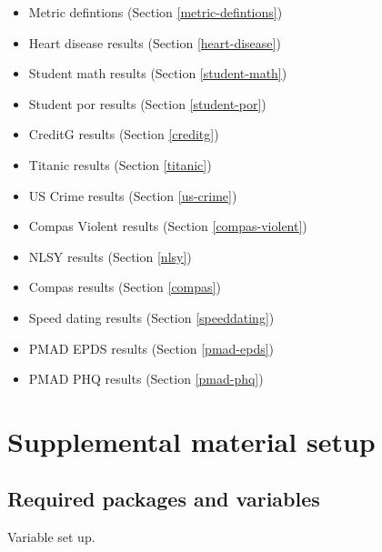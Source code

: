 \documentclass[
]{book}
\providecommand{\tightlist}{%
  \setlength{\itemsep}{0pt}\setlength{\parskip}{0pt}}
\begin{document}
\begin{itemize}
\tightlist
\item
  Metric defintions (Section \ref{metric-defintions})\\
\item
  Heart disease results (Section \ref{heart-disease})
\item
  Student math results (Section \ref{student-math})
\item
  Student por results (Section \ref{student-por})
\item
  CreditG results (Section \ref{creditg})
\item
  Titanic results (Section \ref{titanic})
\item
  US Crime results (Section \ref{us-crime})
\item
  Compas Violent results (Section \ref{compas-violent})
\item
  NLSY results (Section \ref{nlsy})
\item
  Compas results (Section \ref{compas})
\item
  Speed dating results (Section \ref{speeddating})
\item
  PMAD EPDS results (Section \ref{pmad-epds})
\item
  PMAD PHQ results (Section \ref{pmad-phq})
\end{itemize}

\hypertarget{supplemental-material-setup}{%
\section{Supplemental material setup}\label{supplemental-material-setup}}

\hypertarget{required-packages-and-variables}{%
\subsection{Required packages and variables}\label{required-packages-and-variables}}

Variable set up.
\end{document}
